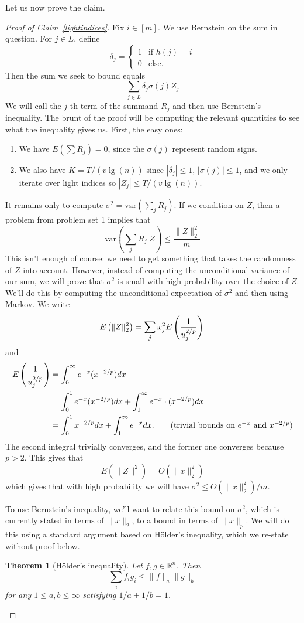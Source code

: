 \documentclass[11pt]{article}
\newtheorem{theorem}{Theorem}
\newcommand{\var}{\text{var}}
\begin{document}
Let us now prove the claim.
\begin{proof}[Proof of Claim~\ref{lightindices}]
Fix $i \in [m]$. We use Bernstein on the sum in question. For $j \in L$, define
\[
\delta_j = \begin{cases}
1 & \text{if } h(j) = i \\
0 & \text{else.}
\end{cases}
\]
Then the sum we seek to bound equals
\[
\sum_{j \in L} \delta_j \sigma(j) Z_j
\]
We will call the $j$-th term of the summand $R_j$ and then use Bernstein's inequality. The brunt of the proof will be computing the relevant quantities to see what the inequality gives us. First, the easy ones:
\begin{enumerate}
\item
We have $E(\sum R_j) = 0$, since the $\sigma(j)$ represent random signs.
\item
We also have $K = T / (v \lg(n))$ since $|\delta_j| \leq 1$, $|\sigma(j)| \leq 1$, and we only iterate over light indices so $|Z_j| \leq T / (v \lg(n))$.
\end{enumerate}

It remains only to compute $\sigma^2 = \var(\sum_j R_j)$. If we condition on $Z$, then a problem from problem set 1 implies that
\[
\var\left(\sum_j R_j | Z\right) \leq \frac{\|Z\|_2^2}{m}
\]
This isn't enough of course: we need to get something that takes the randomness of $Z$ into account. However, instead of computing the unconditional variance of our sum, we will prove that $\sigma^2$ is small with high probability over the choice of $Z$. We'll do this by computing the unconditional expectation of $\sigma^2$ and then using Markov.
We write
\[
E\left(\|Z\|_2^2\right) = \sum_j x_j^2 E\left(\frac{1}{u_j^{2/p}}\right) \\
\]
and
\begin{align*}
E\left(\frac{1}{u_j^{2/p}}\right) &= \int_0^\infty e^{-x} (x^{-2/p}) dx \\
	&= \int_0^1 e^{-x} (x^{-2/p}) dx + \int_1^\infty e^{-x} \cdot (x^{-2/p}) dx \\
	&= \int_0^1 x^{-2/p}dx + \int_1^\infty e^{-x}dx.								\tag*{(trivial bounds on $e^{-x}$ and $x^{-2/p}$)}
\end{align*}
The second integral trivially converges, and the former one converges because $p > 2$. This gives that
\[
E(\|Z\|^2) = O(\|x\|_2^2)
\]
which gives that with high probability we will have $\sigma^2 \leq O(\|x\|_2^2) / m$.

To use Bernstein's inequality, we'll want to relate this bound on $\sigma^2$, which is currently stated in terms of $\|x\|_2$, to a bound in terms of $\|x\|_p$. We will do this using a standard argument based on H\"older's inequality, which we re-state without proof below.
\begin{theorem}[H\"older's inequality]
Let $f, g \in \mathbb{R}^n$. Then
\[
\sum_i f_i g_i \leq \|f\|_a \|g\|_b
\]
for any $1 \leq a,b \leq \infty$ satisfying $1/a + 1/b = 1$.
\end{theorem}


\end{proof}
\end{document}
